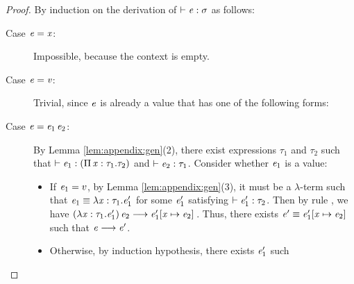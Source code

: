 \begin{proof}
    By induction on the derivation of $\vdash  \mathit{e}  :  \sigma$ as follows:
    \begin{description}
        \item[Case $\mathit{e}  =  \mathit{x}$:] Impossible, because the context is empty.
        \item[Case $\mathit{e}  =  \mathit{v}$:] Trivial, since $\mathit{e}$ is already a value that
has one of the following forms:
		\begin{inparaenum}[(1)]
		    \item $\star$,
			\item $\lambda  \ottmv{x}  \ottsym{:}  \tau  \ottsym{.}  \ottnt{e}$,
			\item $\Pi \, \ottmv{x}  \ottsym{:}  \tau_{{\mathrm{1}}}  \ottsym{.}  \tau_{{\mathrm{2}}}$,
			\item $\kw{cast}^{\uparrow} \, \ottsym{[}  \tau  \ottsym{]} \,  \ottnt{e}$.
		\end{inparaenum}
		\item[Case $\mathit{e}=\mathit{e_{{\mathrm{1}}}} \, \mathit{e_{{\mathrm{2}}}}$:] By Lemma \ref{lem:appendix:gen}(2), there
exist expressions $\tau_{{\mathrm{1}}}$ and $\tau_{{\mathrm{2}}}$ such that $\vdash  \mathit{e_{{\mathrm{1}}}}  :  (  \Pi \, \mathit{x}  :  \tau_{{\mathrm{1}}}  .  \tau_{{\mathrm{2}}}  )$ and
$\vdash  \mathit{e_{{\mathrm{2}}}}  :  \tau_{{\mathrm{1}}}$. Consider whether $\mathit{e_{{\mathrm{1}}}}$ is a value:
    		\begin{itemize}
    		    \item If $\mathit{e_{{\mathrm{1}}}}=v$, by Lemma \ref{lem:appendix:gen}(3), it must be a
$\lambda$-term such that $\mathit{e_{{\mathrm{1}}}}  \equiv  \lambda  \mathit{x}  :  \tau_{{\mathrm{1}}}  .  \mathit{e'_{{\mathrm{1}}}}$ for some $\mathit{e'_{{\mathrm{1}}}}$ satisfying
$\vdash  \mathit{e'_{{\mathrm{1}}}}  :  \tau_{{\mathrm{2}}}$. Then by rule , we have $(  \lambda  \mathit{x}  :  \tau_{{\mathrm{1}}}  .  \mathit{e'_{{\mathrm{1}}}}  ) \, \mathit{e_{{\mathrm{2}}}}  \longrightarrow  \mathit{e'_{{\mathrm{1}}}}  [  \mathit{x}  \mapsto  \mathit{e_{{\mathrm{2}}}}  ] \,$. Thus, there exists $\mathit{e'}  \equiv  \mathit{e'_{{\mathrm{1}}}}  [  \mathit{x}  \mapsto  \mathit{e_{{\mathrm{2}}}}  ] \,$ such that
$\mathit{e}  \longrightarrow  \mathit{e'}$.
    		    \item Otherwise, by induction hypothesis, there exists $\mathit{e'_{{\mathrm{1}}}}$ such

\end{itemize}
\end{description}
\end{proof}
